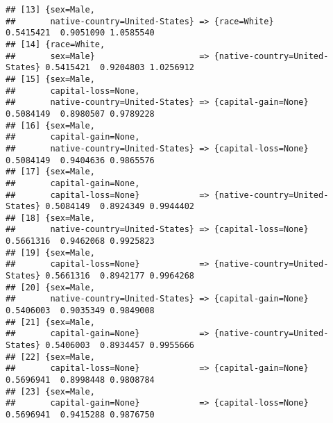 \documentclass[]{article}
\begin{document}
\begin{verbatim}
## [13] {sex=Male,                                                                                     
##       native-country=United-States} => {race=White}                   0.5415421  0.9051090 1.0585540
## [14] {race=White,                                                                                   
##       sex=Male}                     => {native-country=United-States} 0.5415421  0.9204803 1.0256912
## [15] {sex=Male,                                                                                     
##       capital-loss=None,                                                                            
##       native-country=United-States} => {capital-gain=None}            0.5084149  0.8980507 0.9789228
## [16] {sex=Male,                                                                                     
##       capital-gain=None,                                                                            
##       native-country=United-States} => {capital-loss=None}            0.5084149  0.9404636 0.9865576
## [17] {sex=Male,                                                                                     
##       capital-gain=None,                                                                            
##       capital-loss=None}            => {native-country=United-States} 0.5084149  0.8924349 0.9944402
## [18] {sex=Male,                                                                                     
##       native-country=United-States} => {capital-loss=None}            0.5661316  0.9462068 0.9925823
## [19] {sex=Male,                                                                                     
##       capital-loss=None}            => {native-country=United-States} 0.5661316  0.8942177 0.9964268
## [20] {sex=Male,                                                                                     
##       native-country=United-States} => {capital-gain=None}            0.5406003  0.9035349 0.9849008
## [21] {sex=Male,                                                                                     
##       capital-gain=None}            => {native-country=United-States} 0.5406003  0.8934457 0.9955666
## [22] {sex=Male,                                                                                     
##       capital-loss=None}            => {capital-gain=None}            0.5696941  0.8998448 0.9808784
## [23] {sex=Male,                                                                                     
##       capital-gain=None}            => {capital-loss=None}            0.5696941  0.9415288 0.9876750

\end{verbatim}
\end{document}
